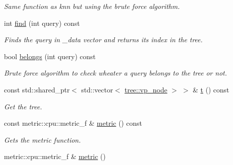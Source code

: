 \begin{DoxyCompactItemize}
\begin{DoxyCompactList}\small\item\em Same function as knn but using the brute force algorithm. \end{DoxyCompactList}\item 
\hypertarget{classtree_1_1cpu_1_1vp__tree_a705a05444e892308fa7156968a29456d}{}int \hyperlink{classtree_1_1cpu_1_1vp__tree_a705a05444e892308fa7156968a29456d}{find} (int query) const \label{classtree_1_1cpu_1_1vp__tree_a705a05444e892308fa7156968a29456d}

\begin{DoxyCompactList}\small\item\em Finds the query in \+\_\+data vector and returns its index in the tree. \end{DoxyCompactList}\item 
\hypertarget{classtree_1_1cpu_1_1vp__tree_a30b6f89d268aae73aeb8a3125eeb631d}{}bool \hyperlink{classtree_1_1cpu_1_1vp__tree_a30b6f89d268aae73aeb8a3125eeb631d}{belongs} (int query) const \label{classtree_1_1cpu_1_1vp__tree_a30b6f89d268aae73aeb8a3125eeb631d}

\begin{DoxyCompactList}\small\item\em Brute force algorithm to check wheater a query belongs to the tree or not. \end{DoxyCompactList}\item 
\hypertarget{classtree_1_1cpu_1_1vp__tree_ad7b31aa027f85f38d293b3e0f9b37048}{}const std\+::shared\+\_\+ptr$<$ std\+::vector$<$ \hyperlink{structtree_1_1vp__node__t}{tree\+::vp\+\_\+node} $>$ $>$ \& \hyperlink{classtree_1_1cpu_1_1vp__tree_ad7b31aa027f85f38d293b3e0f9b37048}{t} () const \label{classtree_1_1cpu_1_1vp__tree_ad7b31aa027f85f38d293b3e0f9b37048}

\begin{DoxyCompactList}\small\item\em Get the tree. \end{DoxyCompactList}\item 
\hypertarget{classtree_1_1cpu_1_1vp__tree_a174296b009a968f5805f17ea013d06cb}{}const metric\+::cpu\+::metric\+\_\+f \& \hyperlink{classtree_1_1cpu_1_1vp__tree_a174296b009a968f5805f17ea013d06cb}{metric} () const \label{classtree_1_1cpu_1_1vp__tree_a174296b009a968f5805f17ea013d06cb}

\begin{DoxyCompactList}\small\item\em Gets the metric function. \end{DoxyCompactList}\item 
\hypertarget{classtree_1_1cpu_1_1vp__tree_a33f823dd101947f371a701107a8dad9d}{}metric\+::cpu\+::metric\+\_\+f \& \hyperlink{classtree_1_1cpu_1_1vp__tree_a33f823dd101947f371a701107a8dad9d}{metric} ()\label{classtree_1_1cpu_1_1vp__tree_a33f823dd101947f371a701107a8dad9d}


\end{DoxyCompactItemize}
